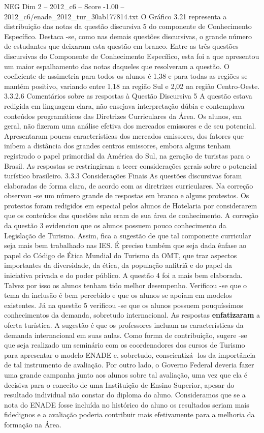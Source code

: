 \begin{textsample}{NEG Dim 2 – 2012\_c6 – Score -1.00 – 2012\_c6/enade\_2012\_tur\_30ab177814.txt}
O Gráfico 3.21 representa a distribuição das notas da questão discursiva 5 do componente de Conhecimento Específico.
Destaca -se, como nas demais questões discursivas, o grande número de estudantes que deixaram esta questão em branco.
Entre as três questões discursivas do Componente de Conhecimento Específico, esta foi a que apresentou um maior espalhamento das notas daqueles que resolveram a questão.
O coeficiente de assimetria para todos os alunos é 1,38 e para todas as regiões se mantém positivo, variando entre 1,18 na região Sul e 2,02 na região Centro-Oeste. 3.3.2.6 Comentários sobre as respostas à Questão Discursiva 5 A questão estava redigida em linguagem clara, não ensejava interpretação dúbia e contemplava conteúdos programáticos das Diretrizes Curriculares da Área.
Os alunos, em geral, não fizeram uma análise efetiva dos mercados emissores e de seu potencial.
Apresentaram poucas características dos mercados emissores, dos fatores que inibem a distância dos grandes centros emissores, embora alguns tenham registrado o papel primordial da América do Sul, na geração de turistas para o Brasil.
As respostas se restringiram a tecer considerações gerais sobre o potencial turístico brasileiro. 3.3.3 Considerações Finais As questões discursivas foram elaboradas de forma clara, de acordo com as diretrizes curriculares.
Na correção observou -se um número grande de respostas em branco e alguns protestos.
Os protestos foram redigidos em especial pelos alunos de Hotelaria por considerarem que os conteúdos das questões não eram de sua área de conhecimento.
A correção da questão 3 evidenciou que os alunos possuem pouco conhecimento da Legislação de Turismo.
Assim, fica a sugestão de que tal componente curricular seja mais bem trabalhado nas IES.
É preciso também que seja dada ênfase ao papel do Código de Ética Mundial do Turismo da OMT, que traz aspectos importantes da diversidade, da ética, da população anfitriã e do papel da iniciativa privada e do poder público.
A questão 4 foi a mais bem elaborada.
Talvez por isso os alunos tenham tido melhor desempenho.
Verificou -se que o tema da inclusão é bem percebido e que os alunos se apoiam em modelos existentes.
Já na questão 5 verificou -se que os alunos possuem pouquíssimos conhecimentos da demanda, sobretudo internacional.
As respostas \textbf{enfatizaram} a oferta turística.
A sugestão é que os professores incluam as características da demanda internacional em suas aulas.
Como forma de contribuição, sugere -se que seja realizado um seminário com os coordenadores dos cursos de Turismo para apresentar o modelo ENADE e, sobretudo, conscientizá -los da importância de tal instrumento de avaliação.
Por outro lado, o Governo Federal deveria fazer uma grande campanha junto aos alunos sobre tal avaliação, uma vez que ela é decisiva para o conceito de uma Instituição de Ensino Superior, apesar do resultado individual não constar do diploma do aluno.
Consideramos que se a nota do ENADE fosse incluída no histórico do aluno os resultados seriam mais fidedignos e a avaliação poderia contribuir mais efetivamente para a melhoria da formação na Área.

\end{textsample}
